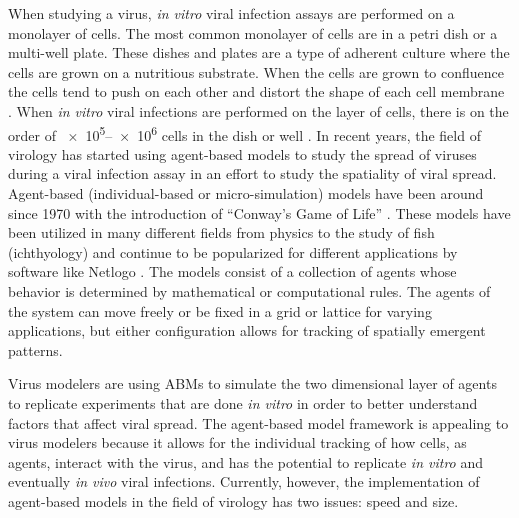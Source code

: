 When studying a virus, \emph{in vitro} viral infection assays are performed on a monolayer of cells. The most common monolayer of cells are in a petri dish or a multi-well plate. These dishes and plates are a type of adherent culture where the cells are grown on a nutritious substrate. When the cells are grown to confluence the cells tend to push on each other and distort the shape of each cell membrane \cite{bruckner_importance_2018}. When \emph{in vitro} viral infections are performed on the layer of cells, there is on the order of \numrange[range-phrase = --]{e5}{e6} cells in the dish or well \cite{Number_of_cells_in_a_dish_noauthor_useful_nodate}. In recent years, the field of virology has started using agent-based models to study the spread of viruses during a viral infection assay \cite{beauchemin_simple_2005,alvarado_cellular-level_2018,wodarz_laws_2014,tong_development_2015,whitman20,goyal16,itakura10,wasik14} in an effort to study the spatiality of viral spread. Agent-based (individual-based or micro-simulation) models have been around since 1970 with the introduction of ``Conway's Game of Life'' \cite{gardner70}. These models have been utilized in many different fields from physics to the study of fish (ichthyology) \cite{owusu20} and continue to be popularized for different applications by software like Netlogo \cite{nogare20,chiacchio14}. The models consist of a collection of agents whose behavior is determined by mathematical or computational rules. The agents of the system can move freely \cite{beauchemin07} or be fixed in a grid or lattice \cite{beauchemin_simple_2005} for varying applications, but either configuration allows for tracking of spatially emergent patterns. 

Virus modelers are using ABMs to simulate the two dimensional layer of agents to replicate experiments that are done \emph{in vitro} in order to better understand factors that affect viral spread. The agent-based model framework is appealing to virus modelers because it allows for the individual tracking of how cells, as agents, interact with the virus, and has the potential to replicate \emph{in vitro} and eventually \emph{in vivo} viral infections. Currently, however, the implementation of agent-based models in the field of virology has two issues: speed and size. 

